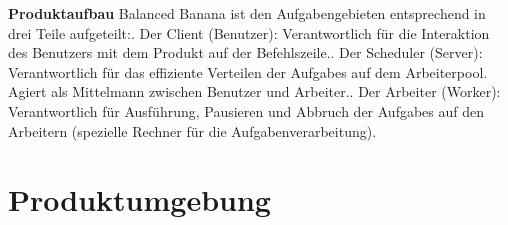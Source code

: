 \documentclass[a4paper,12pt]{article}
\begin{document}
\begin{itemize}
\begin{minipage}[t]{\linewidth}
\item \textbf{Produktaufbau}\newline
Balanced Banana ist den Aufgabengebieten entsprechend in drei Teile aufgeteilt:. Der \gls{Client} (\gls{Benutzer}): Verantwortlich für die Interaktion des Benutzers mit dem Produkt auf der \gls{Befehlszeile}.. Der \gls{Scheduler} (\gls{Server}): Verantwortlich für das effiziente Verteilen der \glspl{Aufgabe} auf dem Arbeiterpool. Agiert als Mittelmann zwischen \gls{Benutzer} und \gls{Arbeiter}.. Der \gls{Arbeiter} (Worker): Verantwortlich für Ausführung, Pausieren und Abbruch der \glspl{Aufgabe} auf den Arbeitern (spezielle Rechner für die Aufgabenverarbeitung).
\end{minipage}
\end{itemize}
\newpage

\newpage
\section{Produktumgebung}
\end{document}
